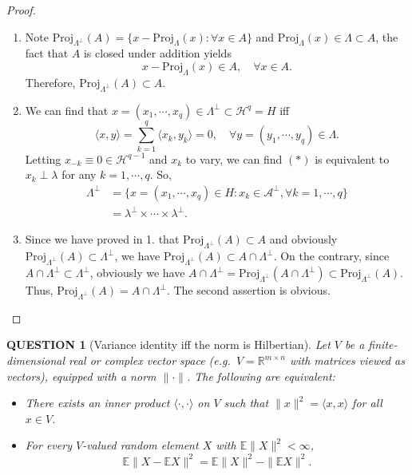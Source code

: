 \documentclass[12pt]{article}
\renewcommand{\(}{\left(}%
\renewcommand{\)}{\right)}%
\renewcommand{\[}{\left[}%
\renewcommand{\]}{\right]}%
\newtheorem{question}{QUESTION}[section]}
\newtheorem{proof}{Proof.}}
\begin{document}
  \begin{proof}
  	\begin{enumerate}
  		\item Note $\mathrm{Proj}_{\Lambda^\perp }(A)=\{x-\mathrm{Proj}_{\Lambda}(x):\forall x\in A\}$ and $\mathrm{Proj}_{\Lambda}(x)\in \Lambda \subset A$, the fact that $A$ is closed under addition yields
  	\begin{equation*}
  		x-\mathrm{Proj}_{\Lambda}(x)\in A,\quad \forall x\in A.
  	\end{equation*}
  	Therefore, $\mathrm{Proj}_{\Lambda^\perp }(A)\subset A.$
  		\item We can find that $x=(x_1,\cdots,x_q)\in \Lambda^\perp\subset \mathscr{H}^q=H$ iff 
  	\begin{equation*}
  		\langle x,y\rangle=\sum_{k=1}^q \langle x_k,y_k\rangle=0,\quad \forall y=(y_1,\cdots,y_q)\in \Lambda.\tag{$*$}
  	\end{equation*}
  	Letting $x_{-k}\equiv 0\in \mathscr{H}^{q-1}$ and $x_k$ to vary,  we can find $(*)$ is equivalent to $x_k\perp \lambda$ for any $k=1,\cdots,q$. So, 
  	\begin{equation*}
  		\begin{split}
  			\Lambda^\perp&=\{x=(x_1,\cdots,x_q)\in H:x_k\in \mathscr{A}^\perp,\forall k=1,\cdots,q \}\\
  			&=\lambda^\perp \times \cdots\times \lambda^\perp.
  		\end{split}
  	\end{equation*}
  		\item Since we have proved in 1. that $\mathrm{Proj}_{\Lambda ^\perp }(A)\subset A$ and obviously $\mathrm{Proj}_{\Lambda ^\perp }(A)\subset \Lambda^\perp$, we have $\mathrm{Proj}_{\Lambda ^\perp }(A)\subset A\cap \Lambda^\perp$. On the contrary, since $A\cap \Lambda^\perp\subset \Lambda^\perp$, obviously we have $A\cap \Lambda^\perp=\mathrm{Proj}_{\Lambda ^\perp }(A\cap \Lambda^\perp)\subset \mathrm{Proj}_{\Lambda ^\perp }(A)$. Thus, $\mathrm{Proj}_{\Lambda ^\perp }(A)= A\cap \Lambda^\perp$. The second assertion is obvious.
  	\end{enumerate}
  \end{proof}

\begin{question}[Variance identity iff the norm is Hilbertian]
Let $V$ be a finite-dimensional real or complex vector space (e.g.\ $V=\mathbb{R}^{m\times n}$ with matrices viewed as vectors), equipped with a norm $\|\cdot\|$. The following are equivalent:
\begin{itemize}
\item[(i)] There exists an inner product $\langle\cdot,\cdot\rangle$ on $V$ such that $\|x\|^2=\langle x,x\rangle$ for all $x\in V$.
\item[(ii)] For every $V$-valued random element $X$ with $\mathbb{E}\|X\|^2<\infty$,
\begin{equation*}
\mathbb{E}\|X-\mathbb{E}X\|^2=\mathbb{E}\|X\|^2-\|\mathbb{E}X\|^2.
\end{equation*}
\end{itemize}
\end{question}
\end{document}
